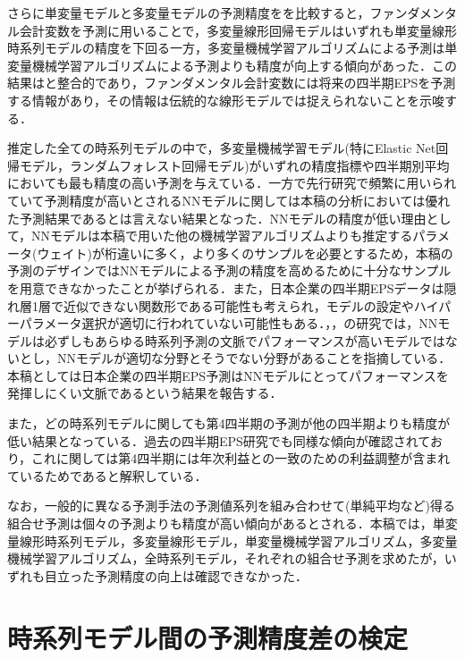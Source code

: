 \documentclass[a4paper，12pt]{jsarticle}
\begin{document}
さらに単変量モデルと多変量モデルの予測精度をを比較すると，ファンダメンタル会計変数を予測に用いることで，多変量線形回帰モデルはいずれも単変量線形時系列モデルの精度を下回る一方，多変量機械学習アルゴリズムによる予測は単変量機械学習アルゴリズムによる予測よりも精度が向上する傾向があった．この結果は\cite{zhang2004neural}と整合的であり，ファンダメンタル会計変数には将来の四半期EPSを予測する情報があり，その情報は伝統的な線形モデルでは捉えられないことを示唆する．

推定した全ての時系列モデルの中で，多変量機械学習モデル(特にElastic Net回帰モデル，ランダムフォレスト回帰モデル)がいずれの精度指標や四半期別平均においても最も精度の高い予測を与えている．一方で先行研究で頻繁に用いられていて予測精度が高いとされるNNモデルに関しては本稿の分析においては優れた予測結果であるとは言えない結果となった．NNモデルの精度が低い理由として，NNモデルは本稿で用いた他の機械学習アルゴリズムよりも推定するパラメータ(ウェイト)が桁違いに多く，より多くのサンプルを必要とするため，本稿の予測のデザインではNNモデルによる予測の精度を高めるために十分なサンプルを用意できなかったことが挙げられる．また，日本企業の四半期EPSデータは隠れ層1層で近似できない関数形である可能性も考えられ，モデルの設定やハイパーパラメータ選択が適切に行われていない可能性もある．\cite{chatfield1993neural}，\cite{hill1994artificial}，\cite{callen1996neural}の研究では，NNモデルは必ずしもあらゆる時系列予測の文脈でパフォーマンスが高いモデルではないとし，NNモデルが適切な分野とそうでない分野があることを指摘している．本稿としては日本企業の四半期EPS予測はNNモデルにとってパフォーマンスを発揮しにくい文脈であるという結果を報告する．

また，どの時系列モデルに関しても第4四半期の予測が他の四半期よりも精度が低い結果となっている．過去の四半期EPS研究でも同様な傾向が確認されており，これに関して\cite{sakurai1990}は第4四半期には年次利益との一致のための利益調整が含まれているためであると解釈している．

なお，一般的に異なる予測手法の予測値系列を組み合わせて(単純平均など)得る組合せ予測\citep*{bates1969combination}は個々の予測よりも精度が高い傾向があるとされる．本稿では，単変量線形時系列モデル，多変量線形モデル，単変量機械学習アルゴリズム，多変量機械学習アルゴリズム，全時系列モデル，それぞれの組合せ予測を求めたが，いずれも目立った予測精度の向上は確認できなかった．

\section{時系列モデル間の予測精度差の検定}
\end{document}
